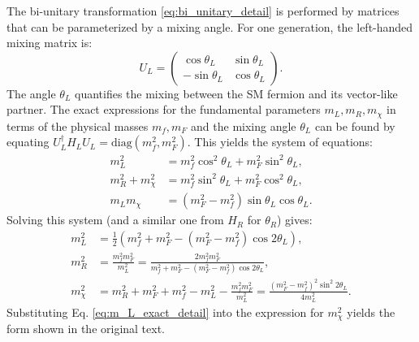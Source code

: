 The bi-unitary transformation \eqref{eq:bi_unitary_detail} is performed by matrices that can be parameterized by a mixing angle. For one generation, the left-handed mixing matrix is:
\begin{equation}
U_L = \begin{pmatrix}
\cos\theta_L & \sin\theta_L \\
-\sin\theta_L & \cos\theta_L
\end{pmatrix}.
\end{equation}
The angle $\theta_L$ quantifies the mixing between the SM fermion and its vector-like partner. The exact expressions for the fundamental parameters $m_L, m_R, m_\chi$ in terms of the physical masses $m_f, m_F$ and the mixing angle $\theta_L$ can be found by equating $U_L^\dagger H_L U_L = \text{diag}(m_f^2, m_F^2)$. This yields the system of equations:
\begin{align*}
m_L^2 &= m_f^2 \cos^2\theta_L + m_F^2 \sin^2\theta_L, \\
m_R^2 + m_\chi^2 &= m_f^2 \sin^2\theta_L + m_F^2 \cos^2\theta_L, \\
m_L m_\chi &= (m_F^2 - m_f^2) \sin\theta_L \cos\theta_L.
\end{align*}
Solving this system (and a similar one from $H_R$ for $\theta_R$) gives:
\begin{align}
m_L^2 &= \frac{1}{2} \left( m_f^2 + m_F^2 - (m_F^2 - m_f^2) \cos 2\theta_L \right), \label{eq:m_L_exact_detail} \\
m_R^2 &= \frac{m_f^2 m_F^2}{m_L^2} = \frac{2 m_f^2 m_F^2}{m_f^2 + m_F^2 - (m_F^2 - m_f^2) \cos 2\theta_L}, \label{eq:m_R_exact_detail} \\
m_{\chi}^2 &= m_R^2 + m_F^2 + m_f^2 - m_L^2 - \frac{m_f^2 m_F^2}{m_L^2} = \frac{(m_F^2 - m_f^2)^2 \sin^2 2\theta_L}{4 m_L^2}. \label{eq:m_chi_exact_detail}
\end{align}
Substituting Eq. \eqref{eq:m_L_exact_detail} into the expression for $m_{\chi}^2$ yields the form shown in the original text.

